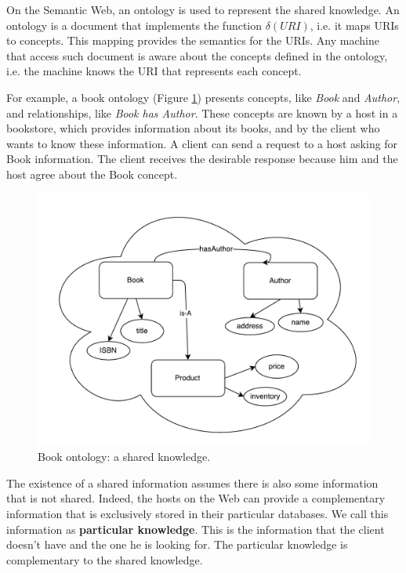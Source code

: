 \documentclass{singlecol-new}
\theoremstyle{TH}{
\newtheorem{lemma}{Lemma}
\newtheorem{theorem}[lemma]{Theorem}
\newtheorem{corrolary}[lemma]{Corrolary}
\newtheorem{conjecture}[lemma]{Conjecture}
\newtheorem{proposition}[lemma]{Proposition}
\newtheorem{claim}[lemma]{Claim}
\newtheorem{stheorem}[lemma]{Wrong Theorem}
\newtheorem{algorithm}{Algorithm}
}
\theoremstyle{THrm}{
\newtheorem{definition}{Definition}[section]
\newtheorem{question}{Question}[section]
\newtheorem{remark}{Remark}
\newtheorem{scheme}{Scheme}
}
\theoremstyle{THhit}{
\newtheorem{case}{Case}[section]
}
\begin{document}
On the Semantic Web, an ontology is used to represent the shared knowledge. 
An ontology is a document that implements the function $\delta(URI)$, i.e. it maps URIs to concepts.
This mapping provides the semantics for the URIs. 
Any machine that access such document is aware about the concepts defined in the ontology, i.e. the machine knows the URI that represents each concept. 

For example, a book ontology (Figure \ref{fig:bookontology}) presents concepts, like \textit{Book} and \textit{Author}, and relationships, like \textit{Book has Author}. These concepts are known by a host in a bookstore, which provides information about its books, and by the client who wants to know these information.  
A client can send a request to a host asking for Book information. The client receives the desirable response because him and the host agree about the Book concept. 

\begin{figure}[!htb]
	\includegraphics[scale=.55]{images/book-ontology.pdf}
	\centering
	\caption{Book ontology: a shared knowledge.}
	\label{fig:bookontology}
\end{figure} 

The existence of a shared information assumes there is also some information that is not shared. Indeed, the hosts on the Web can provide a complementary information that is exclusively stored in their particular databases. 
We call this information as \textbf{particular knowledge}. 
This is the information that the client doesn't have and the one he is looking for. 
The particular knowledge is complementary to the shared knowledge.
\end{document}
